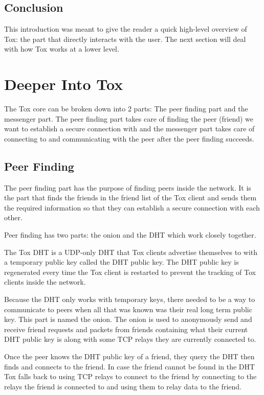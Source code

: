 \documentclass{tox}
\begin{document}
\subsection{Conclusion}

This introduction was meant to give the reader a quick high-level overview of 
Tox: the part that directly interacts with the user. The next section will deal 
with how Tox works at a lower level.

\section{Deeper Into Tox}

The Tox core can be broken down into 2 parts: The peer finding part and the 
messenger part. The peer finding part takes care of finding the peer (friend) 
we 
want to establish a secure connection with and the messenger part takes care of
connecting to and communicating with the peer after the peer finding succeeds.

\subsection{Peer Finding}

The peer finding part has the purpose of finding peers inside the network. It 
is the part that finds the friends in the friend list of the Tox client and 
sends them the required information so that they can establish a secure 
connection with each other.

Peer finding has two parts: the onion and the DHT which work closely together.

The Tox DHT is a UDP-only DHT that Tox clients advertise themselves to with a 
temporary public key called the DHT public key. The DHT public key is 
regenerated every time the Tox client is restarted to prevent the tracking of 
Tox clients inside the network.

Because the DHT only works with temporary keys, there needed to be a way to 
communicate to peers when all that was known was their real long term public 
key. This part is named the onion. The onion is used to anonymously send and 
receive friend requests and packets from friends containing what their current 
DHT public key is along with some TCP relays they are currently connected to.

Once the peer knows the DHT public key of a friend, they query the DHT then 
finds and connects to the friend. In case the friend cannot be found in the DHT 
Tox falls back to using TCP relays to connect to the friend by connecting to 
the relays the friend is connected to and using them to relay data to the 
friend.
\end{document}
